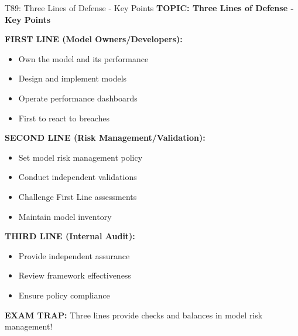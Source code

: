 \documentclass[8pt]{beamer}
\begin{document}
	\begin{frame}{T89: Three Lines of Defense - Key Points}
		\fontsize{6.5}{7.5}\selectfont
		\textbf{TOPIC: Three Lines of Defense - Key Points}
		
		\vspace{0.1cm}
		\textbf{FIRST LINE (Model Owners/Developers):}
		\begin{itemize}
			\item Own the model and its performance
			\item Design and implement models
			\item Operate performance dashboards
			\item First to react to breaches
		\end{itemize}
		
		\vspace{0.1cm}
		\textbf{SECOND LINE (Risk Management/Validation):}
		\begin{itemize}
			\item Set model risk management policy
			\item Conduct independent validations
			\item Challenge First Line assessments
			\item Maintain model inventory
		\end{itemize}
		
		\vspace{0.1cm}
		\textbf{THIRD LINE (Internal Audit):}
		\begin{itemize}
			\item Provide independent assurance
			\item Review framework effectiveness
			\item Ensure policy compliance
		\end{itemize}
		
		\textcolor{myred}{\textbf{EXAM TRAP:}} Three lines provide \textcolor{myblue}{checks and balances in model risk management}!
	\end{frame}
	
\end{document}
